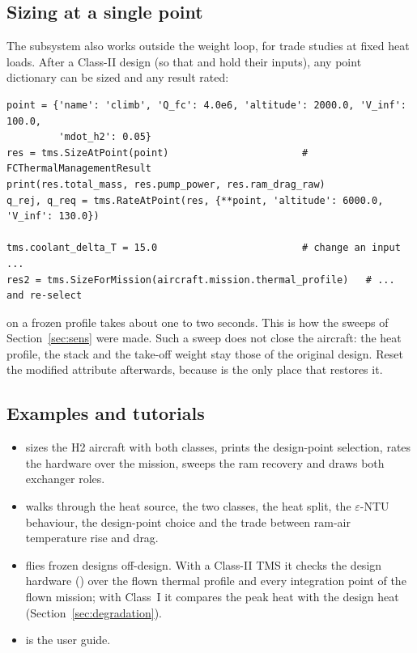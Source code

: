 \documentclass[a4paper,11pt]{article}
\begin{document}
\subsection{Sizing at a single point}
The subsystem also works outside the weight loop, for trade studies at fixed heat loads.
After a Class-II design (so that  and  hold their
inputs), any point dictionary can be sized and any result rated:
\begin{lstlisting}
point = {'name': 'climb', 'Q_fc': 4.0e6, 'altitude': 2000.0, 'V_inf': 100.0,
         'mdot_h2': 0.05}
res = tms.SizeAtPoint(point)                       # FCThermalManagementResult
print(res.total_mass, res.pump_power, res.ram_drag_raw)
q_rej, q_req = tms.RateAtPoint(res, {**point, 'altitude': 6000.0, 'V_inf': 130.0})

tms.coolant_delta_T = 15.0                         # change an input ...
res2 = tms.SizeForMission(aircraft.mission.thermal_profile)   # ... and re-select
\end{lstlisting}
 on a frozen profile takes about one to two seconds. This is how the
sweeps of Section~\ref{sec:sens} were made. Such a sweep does not close the aircraft: the
heat profile, the stack and the take-off weight stay those of the original design. Reset the
modified attribute afterwards, because  is the only place that restores it.

\subsection{Examples and tutorials}
\begin{itemize}
\item {} sizes the H2 aircraft with both classes,
  prints the design-point selection, rates the hardware over the mission, sweeps the ram
  recovery and draws both exchanger roles.
\item {} walks through the heat source, the two
  classes, the heat split, the $\varepsilon$-NTU behaviour, the design-point choice and the
  trade between ram-air temperature rise and drag.
\item {} flies frozen designs off-design. With a
  Class-II TMS it checks the design hardware () over the flown thermal
  profile and every integration point of the flown mission; with Class~I it compares the
  peak heat with the design heat (Section~\ref{sec:degradation}).
\item {} is the user guide.
\end{itemize}
\end{document}
